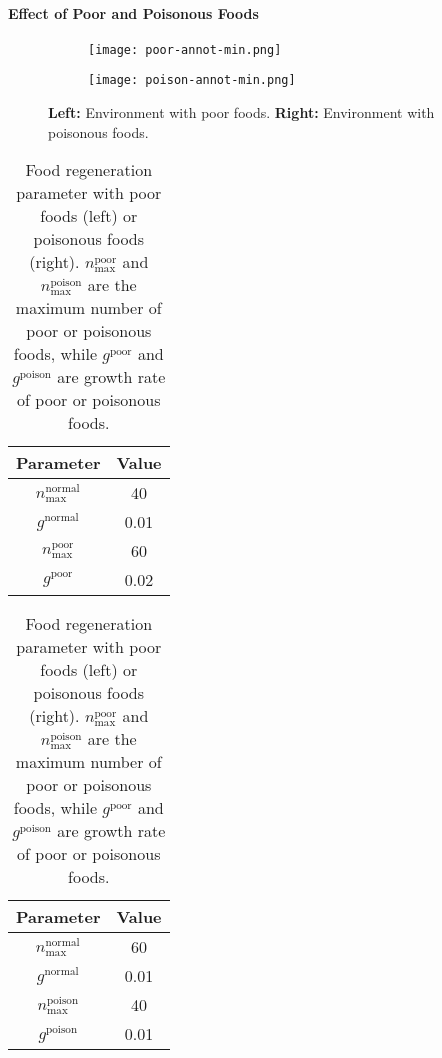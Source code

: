 \paragraph{Effect of Poor and Poisonous Foods}

\begin{figure}[t]
  \begin{subfigure}[t]{4cm}
    \centering
    \texttt{[image: poor-annot-min.png]}
  \end{subfigure}
  \begin{subfigure}[t]{4cm}
    \centering
    \texttt{[image: poison-annot-min.png]}
  \end{subfigure}
  \caption{
    \textbf{Left:} Environment with poor foods.
    \textbf{Right:} Environment with poisonous foods.
  }\label{figure:pp}
\end{figure}

\begin{table}[t]
  \begin{subtable}[h]{0.45\columnwidth}
    \centering
    \begin{tabular}{cc}
      \toprule
      Parameter & Value \\
      \midrule
      $n_{\textrm{max}}^{\textrm{normal}}$ & 40\\
      $g^{\textrm{normal}}$ & 0.01 \\
      $n_{\textrm{max}}^{\textrm{poor}}$ & 60 \\
      $g^{\textrm{poor}}$ & 0.02 \\
      \bottomrule
    \end{tabular}
  \end{subtable}
  \begin{subtable}[h]{0.45\columnwidth}
    \centering
    \begin{tabular}{cc}
      \toprule
      Parameter & Value \\
      \midrule
      $n_{\textrm{max}}^{\textrm{normal}}$ & 60\\
      $g^{\textrm{normal}}$ & 0.01 \\
      $n_{\textrm{max}}^{\textrm{poison}}$ & 40 \\
      $g^{\textrm{poison}}$ & 0.01 \\
      \bottomrule
    \end{tabular}
  \end{subtable}
  \caption{
    Food regeneration parameter with poor foods (left) or poisonous foods (right).
    $n_{\textrm{max}}^{\textrm{poor}}$ and $n_{\textrm{max}}^{\textrm{poison}}$ are the maximum number of poor or poisonous foods, while $g^{\textrm{poor}}$ and $g^{\textrm{poison}}$ are growth rate of poor or poisonous foods.
  }\label{table:pp}
\end{table}

